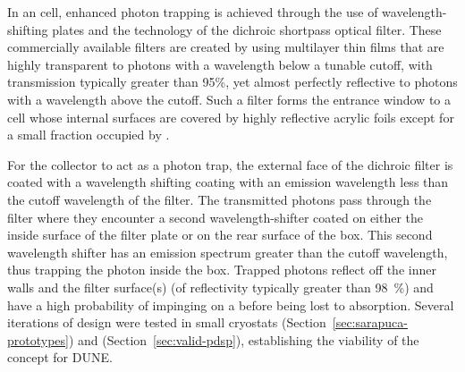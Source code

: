 

In an  cell, enhanced photon trapping is achieved through the
use of wavelength-shifting plates and the technology of the dichroic shortpass optical filter. These commercially available filters are created by using multilayer thin films that are highly transparent to photons with a wavelength below a tunable cutoff, 
with transmission typically greater than 95\%, yet almost perfectly reflective to photons with a wavelength above the cutoff.  Such a filter forms the entrance window to a cell whose internal surfaces are covered by highly reflective acrylic foils
except for a small fraction occupied by .

For the collector to act as a photon trap, the external face of the dichroic filter is coated with a wavelength shifting coating
with an emission wavelength 
less than the cutoff wavelength of the filter. 
The transmitted photons pass through the filter where they encounter a second wavelength-shifter coated on either the inside surface of the filter plate or on the rear surface of the box.%
This second wavelength shifter has an emission spectrum greater than the cutoff wavelength, thus trapping the photon inside the box.
Trapped photons reflect off the inner walls and the filter surface(s) (of reflectivity typically greater than \SI{98}{\%}) 
and have a high probability of impinging on a  before being lost to absorption. 
Several iterations of  design were tested in small cryostats (Section~\ref{sec:sarapuca-prototypes}) and  (Section~\ref{sec:valid-pdsp}), establishing the viability of the concept for DUNE.

